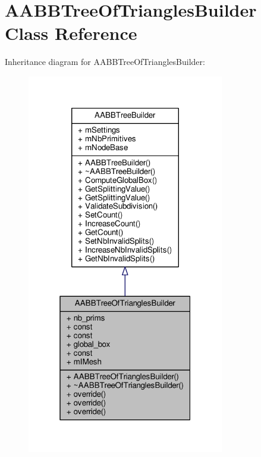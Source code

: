\hypertarget{classAABBTreeOfTrianglesBuilder}{}\section{A\+A\+B\+B\+Tree\+Of\+Triangles\+Builder Class Reference}
\label{classAABBTreeOfTrianglesBuilder}


Inheritance diagram for A\+A\+B\+B\+Tree\+Of\+Triangles\+Builder\+:
\nopagebreak
\begin{figure}[H]
\begin{center}
\leavevmode
\includegraphics[width=244pt]{d4/db8/classAABBTreeOfTrianglesBuilder__inherit__graph}
\end{center}
\end{figure}


